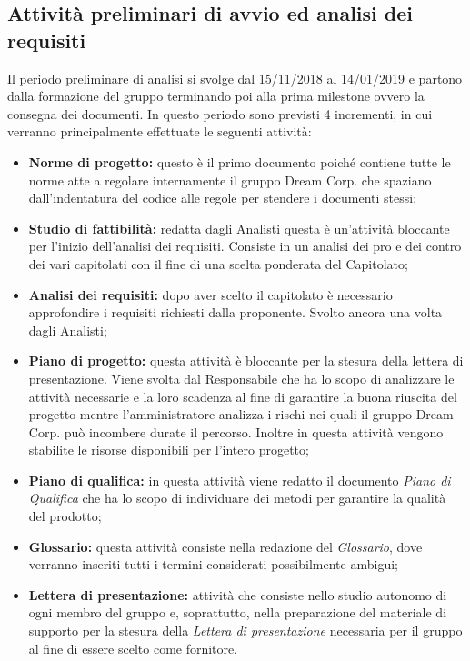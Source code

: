 \newpage
\subsection{Attività preliminari di avvio ed analisi dei requisiti}
Il periodo preliminare di analisi si svolge dal 15/11/2018 al 14/01/2019 e partono dalla formazione del gruppo terminando poi alla prima milestone ovvero la consegna dei documenti. \newline
In questo periodo sono previsti 4 incrementi, in cui verranno principalmente effettuate le seguenti attività:
\begin{itemize}
	\item\textbf{Norme di progetto:} questo è il primo documento poiché contiene tutte le norme atte a regolare internamente il gruppo Dream Corp. che spaziano dall'indentatura del codice alle regole per stendere i documenti stessi;
	\item\textbf{Studio di fattibilità:} redatta dagli Analisti questa è un'attività bloccante per l'inizio dell'analisi dei requisiti. Consiste in un analisi dei pro e dei contro dei vari capitolati con il fine di una scelta ponderata del Capitolato\pedice;
	\item\textbf{Analisi dei requisiti:} dopo aver scelto il capitolato è necessario approfondire i requisiti richiesti dalla proponente. Svolto ancora una volta dagli Analisti;
	\item\textbf{Piano di progetto:} questa attività è bloccante per la stesura della lettera di presentazione. Viene svolta dal Responsabile che ha lo scopo di analizzare le attività necessarie e la loro scadenza al fine di garantire la  buona riuscita del progetto mentre l'amministratore analizza i rischi nei quali il gruppo Dream Corp. può incombere durate il percorso. Inoltre in questa attività vengono stabilite le risorse disponibili per l'intero progetto;
	\item\textbf{Piano di qualifica:} in questa attività viene redatto il documento \textit{Piano di Qualifica} che ha lo scopo di individuare dei metodi per garantire la qualità del prodotto;
	\item\textbf{Glossario:} questa attività consiste nella redazione del \textit{Glossario}, dove verranno inseriti tutti i termini considerati possibilmente ambigui;
	\item\textbf{Lettera di presentazione:} attività che consiste nello studio autonomo di ogni membro del gruppo e, soprattutto, nella preparazione del materiale di supporto per la stesura della \textit{Lettera di presentazione} necessaria per il gruppo al fine di essere scelto come fornitore.
\end{itemize}

